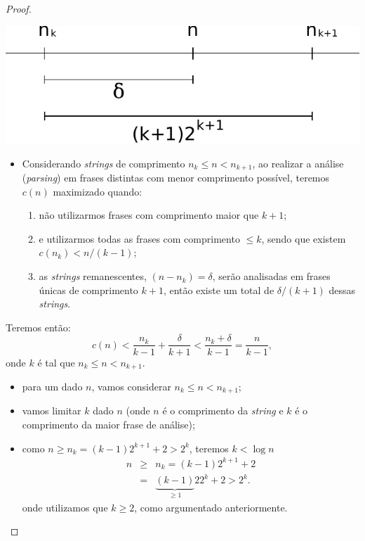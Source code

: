 \begin{frame}[allowframebreaks]
\begin{proof}
\begin{itemize}
	\includegraphics[width=0.6\linewidth]{images/nnkinterval.pdf}
	\end{itemize}

	\proofbreak
	\begin{itemize}
        \item Considerando \textit{strings} de comprimento $n_k \leq n < n_{k+1}$,
		ao realizar a análise (\textit{parsing}) em frases distintas 
		com menor comprimento possível, teremos $c(n)$ maximizado quando:
		\begin{enumerate}
		\item não utilizarmos frases com comprimento maior que $k+1$;
		\item e utilizarmos todas as frases com comprimento $\leq k$, sendo
			que existem $c(n_k) < n / (k-1)$;
		\item as \textit{strings} remanescentes, $(n - n_k) = \delta$, serão 
			analisadas em frases únicas de comprimento $k+1$, então existe
			um total de $\delta / (k+1)$ dessas \textit{strings}.
		\end{enumerate}
	\end{itemize}
	\proofbreak

	Teremos então:
	\begin{equation}
	c(n) < \frac{n_k}{k-1} + \frac{\delta}{k+1} < \frac{n_k + \delta}{k - 1} = \frac{n}{k - 1} ,
	\end{equation}
	onde $k$ é tal que $n_k \leq n < n_{k+1}$.

	\proofbreak

	\begin{itemize}
	\item para um dado $n$, vamos considerar $n_k \leq n < n_{k+1}$;
	\item vamos limitar $k$ dado $n$ (onde $n$ é o comprimento da \textit{string} e
		$k$ é o comprimento da maior frase de análise);
	\item como $n \geq n_k = (k-1)2^{k+1} + 2 > 2^k$, teremos $k < \log n$
		\begin{eqnarray}
		n &\geq& n_k = (k-1)2^{k+1} + 2 \nonumber \\
			&=& \underbrace{(k-1)}_{\geq 1} 2 2^k + 2 > 2^k .
		\end{eqnarray}
	onde utilizamos que $k \geq 2$, como argumentado anteriormente.
	\end{itemize}


\end{proof}
\end{frame}
